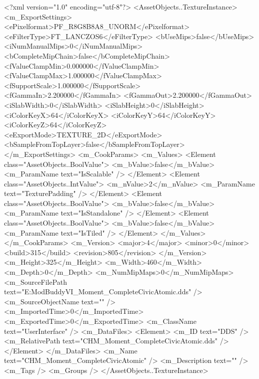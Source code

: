﻿<?xml version="1.0" encoding="utf-8"?>
<AssetObjects..TextureInstance>
  <m_ExportSettings>
    <ePixelformat>PF_R8G8B8A8_UNORM</ePixelformat>
    <eFilterType>FT_LANCZOS6</eFilterType>
    <bUseMips>false</bUseMips>
    <iNumManualMips>0</iNumManualMips>
    <bCompleteMipChain>false</bCompleteMipChain>
    <fValueClampMin>0.000000</fValueClampMin>
    <fValueClampMax>1.000000</fValueClampMax>
    <fSupportScale>1.000000</fSupportScale>
    <fGammaIn>2.200000</fGammaIn>
    <fGammaOut>2.200000</fGammaOut>
    <iSlabWidth>0</iSlabWidth>
    <iSlabHeight>0</iSlabHeight>
    <iColorKeyX>64</iColorKeyX>
    <iColorKeyY>64</iColorKeyY>
    <iColorKeyZ>64</iColorKeyZ>
    <eExportMode>TEXTURE_2D</eExportMode>
    <bSampleFromTopLayer>false</bSampleFromTopLayer>
  </m_ExportSettings>
  <m_CookParams>
    <m_Values>
      <Element class="AssetObjects..BoolValue">
        <m_bValue>false</m_bValue>
        <m_ParamName text="IsScalable" />
      </Element>
      <Element class="AssetObjects..IntValue">
        <m_nValue>2</m_nValue>
        <m_ParamName text="TexturePadding" />
      </Element>
      <Element class="AssetObjects..BoolValue">
        <m_bValue>false</m_bValue>
        <m_ParamName text="IsStandalone" />
      </Element>
      <Element class="AssetObjects..BoolValue">
        <m_bValue>false</m_bValue>
        <m_ParamName text="IsTiled" />
      </Element>
    </m_Values>
  </m_CookParams>
  <m_Version>
    <major>4</major>
    <minor>0</minor>
    <build>315</build>
    <revision>805</revision>
  </m_Version>
  <m_Height>325</m_Height>
  <m_Width>460</m_Width>
  <m_Depth>0</m_Depth>
  <m_NumMipMaps>0</m_NumMipMaps>
  <m_SourceFilePath text="E:\Documents\Firaxis ModBuddy\Civilization VI\ColoredHistoricMoments\ColoredHistoricMoments\Textures\CHM_Moment_CompleteCivicAtomic.dds" />
  <m_SourceObjectName text="" />
  <m_ImportedTime>0</m_ImportedTime>
  <m_ExportedTime>0</m_ExportedTime>
  <m_ClassName text="UserInterface" />
  <m_DataFiles>
    <Element>
      <m_ID text="DDS" />
      <m_RelativePath text="CHM_Moment_CompleteCivicAtomic.dds" />
    </Element>
  </m_DataFiles>
  <m_Name text="CHM_Moment_CompleteCivicAtomic" />
  <m_Description text="" />
  <m_Tags />
  <m_Groups />
</AssetObjects..TextureInstance>